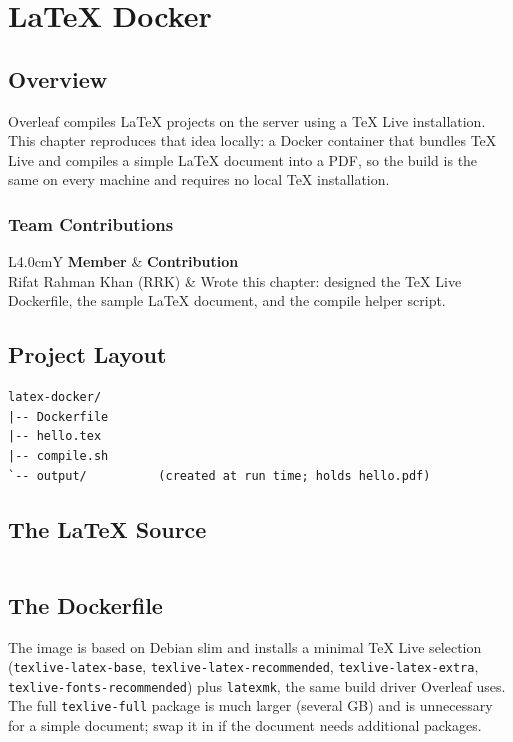 \chapter{LaTeX Docker}

\section{Overview}
Overleaf compiles LaTeX projects on the server using a TeX Live installation.
This chapter reproduces that idea locally: a Docker container that bundles TeX
Live and compiles a simple LaTeX document into a PDF, so the build is the same
on every machine and requires no local TeX installation.

\subsection{Team Contributions}
\begin{tabularx}{\linewidth}{L{4.0cm}Y}
\toprule \textbf{Member} & \textbf{Contribution}\\ \midrule
Rifat Rahman Khan (RRK) & Wrote this chapter: designed the TeX Live Dockerfile, the sample LaTeX document, and the compile helper script.\\ \bottomrule
\end{tabularx}

\section{Project Layout}
\begin{verbatim}
latex-docker/
|-- Dockerfile
|-- hello.tex
|-- compile.sh
`-- output/          (created at run time; holds hello.pdf)
\end{verbatim}

\section{The LaTeX Source}
\begin{listing}[H]
\inputminted[fontsize=\small,breaklines,frame=lines,linenos]{latex}{latex-docker/hello.tex}
\caption{\texttt{hello.tex}: the document compiled by the container.}
\end{listing}

\section{The Dockerfile}
The image is based on Debian slim and installs a minimal TeX Live selection
(\texttt{texlive-latex-base}, \texttt{texlive-latex-recommended},
\texttt{texlive-latex-extra}, \texttt{texlive-fonts-recommended}) plus
\texttt{latexmk}, the same build driver Overleaf uses. The full
\texttt{texlive-full} package is much larger (several GB) and is unnecessary for
a simple document; swap it in if the document needs additional packages.

